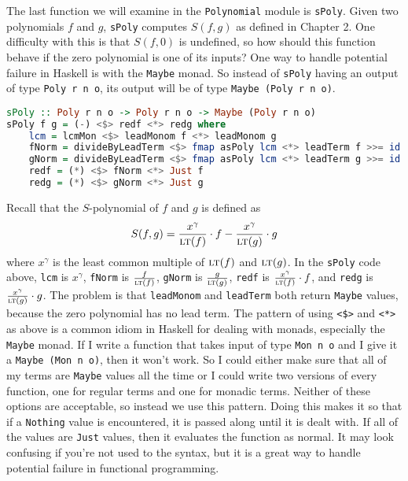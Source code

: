\documentclass[MS, xcolor=dvipsnames]{wfuthesis}
\newcommand{\LT}{\ensuremath{\text{\sc lt}}}
\theoremstyle{definition}
\begin{document}
The last function we will examine in the \lstinline{Polynomial} module is \lstinline{sPoly}. Given two polynomials $f$ and $g$, \lstinline{sPoly} computes $S(f,g)$ as defined in Chapter 2. One difficulty with this is that $S(f,0)$ is undefined, so how should this function behave if the zero polynomial is one of its inputs? One way to handle potential failure in Haskell is with the \lstinline{Maybe} monad. So instead of \lstinline{sPoly} having an output of type \lstinline{Poly r n o}, its output will be of type \lstinline{Maybe (Poly r n o)}.
\begin{lstlisting}[language=Haskell]
sPoly :: Poly r n o -> Poly r n o -> Maybe (Poly r n o)
sPoly f g = (-) <$> redf <*> redg where
    lcm = lcmMon <$> leadMonom f <*> leadMonom g
    fNorm = divideByLeadTerm <$> fmap asPoly lcm <*> leadTerm f >>= id
    gNorm = divideByLeadTerm <$> fmap asPoly lcm <*> leadTerm g >>= id
    redf = (*) <$> fNorm <*> Just f
    redg = (*) <$> gNorm <*> Just g
\end{lstlisting}
Recall that the $S$-polynomial of $f$ and $g$ is defined as
\[ S(f,g) = \frac{x^\gamma}{\LT(f)} \cdot f - \frac{x^\gamma}{\LT(g)} \cdot g \]
where $x^\gamma$ is the least common multiple of $\LT(f)$ and $\LT(g)$. In the \lstinline{sPoly} code above, \lstinline{lcm} is $x^\gamma$, \lstinline{fNorm} is $\frac{f}{\LT(f)}$, \lstinline{gNorm} is $\frac{g}{\LT(g)}$, \lstinline{redf} is $\frac{x^\gamma}{\LT(f)} \cdot f$, and \lstinline{redg} is $\frac{x^\gamma}{\LT(g)} \cdot g$. The problem is that \lstinline{leadMonom} and \lstinline{leadTerm} both return \lstinline{Maybe} values, because the zero polynomial has no lead term. The pattern of using \lstinline{<$>} and \lstinline{<*>} as above is a common idiom in Haskell for dealing with monads, especially the \lstinline{Maybe} monad. If I write a function that takes input of type \lstinline{Mon n o} and I give it a \lstinline{Maybe (Mon n o)}, then it won't work. So I could either make sure that all of my terms are \lstinline{Maybe} values all the time or I could write two versions of every function, one for regular terms and one for monadic terms. Neither of these options are acceptable, so instead we use this pattern. Doing this makes it so that if a \lstinline{Nothing} value is encountered, it is passed along until it is dealt with. If all of the values are \lstinline{Just} values, then it evaluates the function as normal. It may look confusing if you're not used to the syntax, but it is a great way to handle potential failure in functional programming. \par
\end{document}
